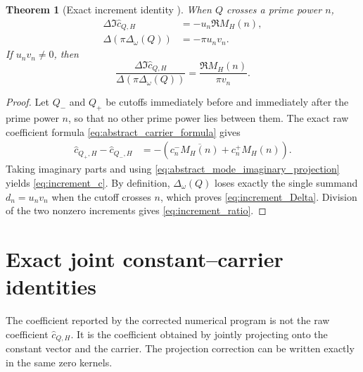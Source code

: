 \documentclass[11pt]{amsart}
\numberwithin{equation}{section}
\theoremstyle{plain}
\newtheorem{theorem}{Theorem}[section]
\theoremstyle{definition}
\theoremstyle{remark}
\newcommand{\1}{\mathbf{1}}
\begin{document}
\begin{theorem}[Exact increment identity {}]
\label{thm:increment_identity}
When \(Q\) crosses a prime power \(n\),
\begin{align}
\Delta\Im\widehat c_{Q,H}
&=
-u_n\Re M_H(n),
\label{eq:increment_c}
\\
\Delta\left(\pi\Delta_\omega(Q)\right)
&=
-\pi u_nv_n.
\label{eq:increment_Delta}
\end{align}
If \(u_nv_n\neq0\), then
\begin{equation}
\boxed{
\frac{
\Delta\Im\widehat c_{Q,H}
}{
\Delta(\pi\Delta_\omega(Q))
}
=
\frac{\Re M_H(n)}{\pi v_n}.
}
\label{eq:increment_ratio}
\end{equation}
\end{theorem}

\begin{proof}
Let \(Q_-\) and \(Q_+\) be cutoffs immediately before and immediately
after the prime power \(n\), so that no other prime power lies between
them.  The exact raw coefficient formula
\eqref{eq:abstract_carrier_formula} gives
\begin{align}
\widehat c_{Q_+,H}-\widehat c_{Q_-,H}
&=
-\left(
c_n^-\overline{M_H(n)}+c_n^+M_H(n)
\right).
\label{eq:increment_raw_complex}
\end{align}
Taking imaginary parts and using
\eqref{eq:abstract_mode_imaginary_projection} yields
\eqref{eq:increment_c}.  By definition,
\(\Delta_\omega(Q)\) loses exactly the single summand
\(d_n=u_nv_n\) when the cutoff crosses \(n\), which proves
\eqref{eq:increment_Delta}.  Division of the two nonzero increments gives
\eqref{eq:increment_ratio}.
\end{proof}


\section{Exact joint constant--carrier identities}
\label{sec:exact_joint_carrier_identities}

The coefficient reported by the corrected numerical program is not the
raw coefficient \(\widehat c_{Q,H}\).  It is the coefficient obtained by
jointly projecting onto the constant vector and the carrier.  The
projection correction can be written exactly in the same zero kernels.
\end{document}
